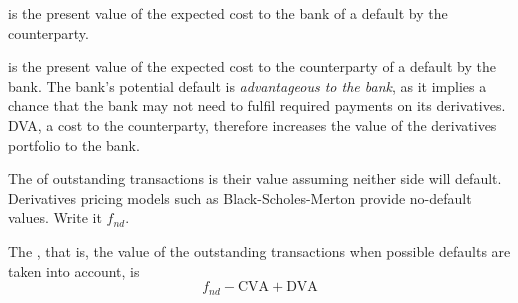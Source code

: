 
\begin{crdefbox}
 is the present value of the expected cost
to the bank of a default by the counterparty.

\smallskip
{} is the present value of the expected cost
to the counterparty of a default by the bank. The bank's potential default is
\emph{advantageous to the bank}, as it implies a chance that the bank may not need
to fulfil required payments on its derivatives. DVA, a cost to the counterparty,
therefore increases the value of the derivatives portfolio to the bank.
\end{crdefbox}

\begin{crdefbox}
The  of outstanding transactions is their value assuming
neither side will default. Derivatives pricing models such as
Black-Scholes-Merton provide no-default values. Write it $f_{nd}$.

\smallskip
The , that is, the value of the outstanding
transactions when possible defaults are taken into account, is
\[ f_{nd} - \mathrm{CVA} + \mathrm{DVA} \]
\end{crdefbox}

